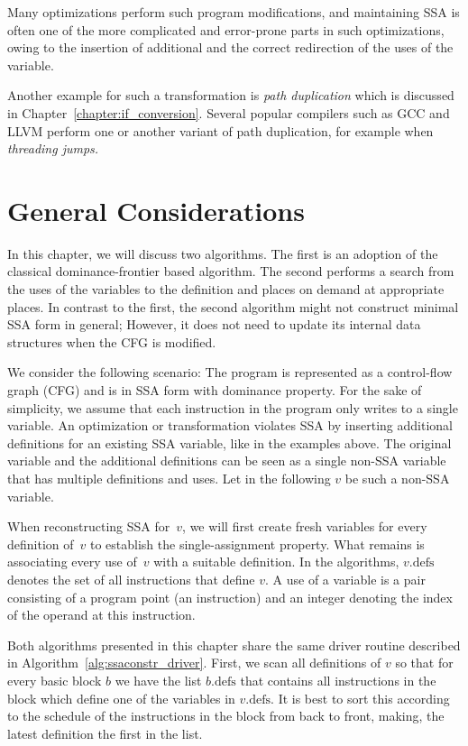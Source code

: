 {Many optimizations perform such program modifications, and
maintaining SSA is often one of the more complicated and error-prone parts in
such optimizations, owing to the insertion of additional \phifuns and the
correct redirection of the uses of the variable.

Another example for such a transformation is \emph{path duplication} which is discussed in Chapter~\ref{chapter:if_conversion}.
Several popular compilers such as GCC and LLVM perform one or another variant of path duplication, for example when \emph{threading jumps.}

\section{General Considerations}
In this chapter, we will discuss two algorithms.
The first is an adoption of the classical dominance-frontier based algorithm.
The second performs a search from the uses of the variables to the definition and places \phifuns on demand at appropriate places.
In contrast to the first, the second algorithm might not construct minimal SSA
form in general;
However, it does not need to update its internal data structures when the CFG is modified.

We consider the following scenario: The program is represented as a control-flow graph (CFG) and is in SSA form with dominance property.
For the sake of simplicity, we assume that each instruction in the program only writes to a single variable.
An optimization or transformation violates SSA by inserting additional definitions for an existing SSA variable, like in the examples above.
The original variable and the additional definitions can be seen as a single non-SSA variable that has multiple definitions and uses.
Let in the following $v$ be such a non-SSA variable.

When reconstructing SSA for~$v$, we will first create fresh variables for every definition of~$v$ to establish the single-assignment property.
What remains is associating every use of~$v$ with a suitable definition.
In the algorithms, $v.\textrm{defs}$ denotes the set of all instructions that define $v$.
A use of a variable is a pair consisting of a program point (an instruction) and an integer denoting the index of the operand at this instruction.

Both algorithms presented in this chapter share the same driver routine
described in Algorithm~\ref{alg:ssaconstr_driver}.
First, we scan all definitions of $v$ so that
for every basic block $b$ we have the list $b.\textrm{defs}$ that contains all instructions in the block which define one of the variables in $v.\textrm{defs}$.
It is best to sort this according to the schedule of the instructions in the block from back to front, making, the latest definition the first in the list.

}
